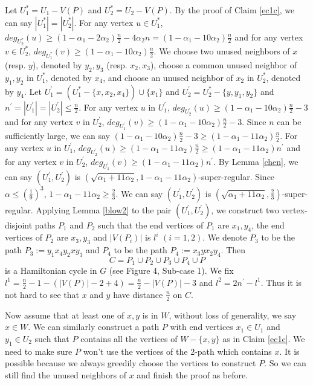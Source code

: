 \documentclass[11pt]{article}
\begin{document}
Let $U_1^{*}=U_1-V(P)$ and $U_2^{*}=U_2-V(P)$. By the proof of Claim \ref{ec1c}, we can say $|U_1^{*}|=|U_2^{*}|$. For any vertex $u\in U_1^{*}$, $deg_{U_2^{*}}(u)\geq (1-\alpha_1-2\alpha_2)\frac{n}{2}-4\alpha_2n=(1-\alpha_1-10\alpha_2)\frac{n}{2}$ and for any vertex $v\in U_2^{*}$, $deg_{U_1^{*}}(v)\geq (1-\alpha_1-10\alpha_2)\frac{n}{2}$. We choose two unused neighbors of $x$ (resp. $y$), denoted by $y_2, y_3$ (resp. $x_2,x_3$), choose a common unused neighbor of $y_1,y_2$ in $U_1^*$, denoted by $x_4$, and choose an unused neighbor of $x_2$ in $U_2^*$, denoted by $y_4$. Let $U_1^{'}=(U_1^*-\{x,x_2,x_4\})\cup \{x_1\}$ and $U_2^{'}=U_2^*-\{y,y_1,y_2\}$ and $n^{'}=|U_1^{'}|=|U_2^{'}|\leq \frac{n}{2}$. For any vertex $u$ in $U_1^{'}$, $deg_{U_2^{'}}(u)\geq (1-\alpha_1-10\alpha_2)\frac{n}{2}-3$ and for any vertex $v$ in $U_2^{'}$, $deg_{U_1^{'}}(v)\geq (1-\alpha_1-10\alpha_2)\frac{n}{2}-3$. Since $n$ can be sufficiently large, we can say $(1-\alpha_1-10\alpha_2)\frac{n}{2}-3\geq (1-\alpha_1-11\alpha_2)\frac{n}{2}$. For any vertex $u$ in $U_1^{'}$, $deg_{U_2^{'}}(u)\geq (1-\alpha_1-11\alpha_2)\frac{n}{2}\geq (1-\alpha_1-11\alpha_2)n^{'}$ and for any vertex $v$ in $U_2^{'}$, $deg_{U_1^{'}}(v)\geq (1-\alpha_1-11\alpha_2)n^{'}$. By Lemma \ref{chen}, we can say $(U_1^{'},U_2^{'})$ is $(\sqrt{\alpha_1+11\alpha_2},1-\alpha_1-11\alpha_2)$-super-regular. Since $\alpha \leq (\frac{1}{9})^3$, $1-\alpha_1-11\alpha_2\geq \frac{2}{3}$. We can say $(U_1^{'},U_2^{'})$ is $(\sqrt{\alpha_1+11\alpha_2},\frac{2}{3})$-super-regular. Applying Lemma \ref{blow2} to the pair $(U_1^{'},U_2^{'})$, we construct two vertex-disjoint paths $P_1$ and $P_2$ such that the end vertices of $P_1$ are $x_1, y_4$, the end vertices of $P_2$ are $x_3, y_3$ and $|V(P_i)|$ is $l^i$ $(i=1,2)$. We denote $P_3$ to be the path $P_3:=y_1x_4y_2xy_3$ and $P_4$ to be the path $P_4:=x_3yx_2y_4$. Then
$$C=P_1\cup P_2\cup P_3\cup P_4\cup P$$
is a Hamiltonian cycle in $G$ (see Figure 4, Sub-case 1). We fix $l^1=\frac{n}{2}-1-(|V(P)|-2+4)=\frac{n}{2}-|V(P)|-3$ and $l^2=2n^{'}-l^1$. Thus it is not hard to see that $x$ and $y$ have distance $\frac{n}{2}$ on $C$.

Now assume that at least one of $x,y$ is in $W$, without loss of generality, we say $x\in W$. We can similarly construct a path $P$ with end vertices $x_1\in U_1$ and $y_1\in U_2$ such that $P$ contains all the vertices of $W-\{x,y\}$ as in Claim \ref{ec1c}. We need to make sure $P$ won't use the vertices of the 2-path which contains $x$. It is possible because we always greedily choose the vertices to construct $P$. So we can still find the unused neighbors of $x$ and finish the proof as before.
\end{document}
